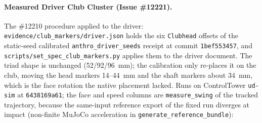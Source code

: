 \documentclass[11pt,a4paper]{article}
\begin{document}
\paragraph{Measured Driver Club Cluster (Issue \#12221).}
The \#12210 procedure applied to the driver: \texttt{evidence/club\_markers/driver.json}
holds the six \texttt{Clubhead} offsets of the static-seed calibrated
\texttt{anthro\_driver\_seeds} receipt at commit \texttt{1bef553457}, and
\texttt{scripts/set\_spec\_club\_markers.py} applies them to the driver
document. The triad shape is unchanged (52/92/96~mm); the calibration only
re-places it on the club, moving the head markers 14--44~mm and the shaft
markers about 34~mm, which is the face rotation the native placement lacked.
Runs on ControlTower \texttt{ud-sim} at \texttt{6438169a61}; the face and
speed columns are \texttt{measure\_swing} of the tracked trajectory, because
the same-input reference export of the fixed run diverges at impact
(non-finite MuJoCo acceleration in \texttt{generate\_reference\_bundle}):
\end{document}
